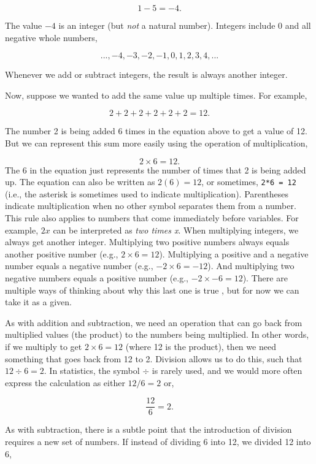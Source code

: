 \documentclass[
  openany]{scrbook}
\begin{document}
\[1 - 5 = -4.\]

The value \(-4\) is an integer (but \emph{not} a natural number).
Integers include 0 and all negative whole numbers,

\[..., -4, -3, -2, -1, 0, 1, 2, 3, 4,  ...\]

Whenever we add or subtract integers, the result is always another integer.

Now, suppose we wanted to add the same value up multiple times.
For example,

\[2 + 2 + 2 + 2 + 2 + 2 = 12.\]

The number 2 is being added 6 times in the equation above to get a value of 12.
But we can represent this sum more easily using the operation of multiplication,

\[2 \times 6 = 12.\]
The 6 in the equation just represents the number of times that 2 is being added up.
The equation can also be written as \(2(6) = 12\), or sometimes, \texttt{2*6\ =\ 12} (i.e., the asterisk is sometimes used to indicate multiplication).
Parentheses indicate multiplication when no other symbol separates them from a number.
This rule also applies to numbers that come immediately before variables.
For example, \(2x\) can be interpreted as \emph{two times x}.
When multiplying integers, we always get another integer.
Multiplying two positive numbers always equals another positive number (e.g., \(2 \times 6 = 12\)).
Multiplying a positive and a negative number equals a negative number (e.g., \(-2 \times 6 = -12\)).
And multiplying two negative numbers equals a positive number (e.g., \(-2 \times -6 = 12\)).
There are multiple ways of thinking about why this last one is true \citep[see, e.g.,][ for one explanation]{Askey1999}, but for now we can take it as a given.

As with addition and subtraction, we need an operation that can go back from multiplied values (the product) to the numbers being multiplied.
In other words, if we multiply to get \(2 \times 6 = 12\) (where 12 is the product), then we need something that goes back from 12 to 2.
Division allows us to do this, such that \(12 \div 6 = 2\).
In statistics, the symbol \(\div\) is rarely used, and we would more often express the calculation as either \(12/6 = 2\) or,

\[\frac{12}{6} = 2.\]

As with subtraction, there is a subtle point that the introduction of division requires a new set of numbers.
If instead of dividing 6 into 12, we divided 12 into 6,
\end{document}

